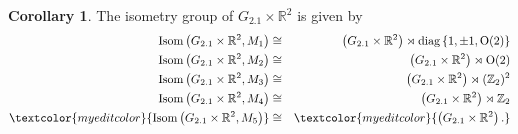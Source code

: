 \documentclass[12pt,a4paper,twoside]{article}
\theoremstyle{definition}
\newtheorem{corollary}[theorem]{Corollary}
\newcommand{\edit}[1]{\textcolor{myeditcolor}{#1}}
\begin{document}
\begin{corollary}
The isometry group of $G_{2.1} \times \mathbb{R}^2$ is given by
\begin{eqnarray*}
\operatorname{Isom}\left(G_{2.1} \times \mathbb{R}^2, M_1\right)  &\cong& \left( G_{2.1} \times \mathbb{R}^2\right) \rtimes \operatorname{diag}\left\lbrace 1, \pm1, \operatorname{O}(2)\right\rbrace\\
\operatorname{Isom}\left(G_{2.1} \times \mathbb{R}^2, M_2\right)  &\cong& \left( G_{2.1} \times \mathbb{R}^2\right) \rtimes \operatorname{O}(2) \\
\operatorname{Isom}\left(G_{2.1} \times \mathbb{R}^2, M_3\right)  &\cong& \left( G_{2.1} \times \mathbb{R}^2\right) \rtimes (\mathbb{Z}_2)^2\\
\operatorname{Isom}\left(G_{2.1} \times \mathbb{R}^2, M_4\right)  &\cong& \left( G_{2.1} \times \mathbb{R}^2\right) \rtimes \mathbb{Z}_2\\
\edit{\operatorname{Isom}\left(G_{2.1} \times \mathbb{R}^2, M_5\right)}  &\cong& \edit{\left( G_{2.1} \times \mathbb{R}^2\right).}
\end{eqnarray*}
\end{corollary}
\end{document}
